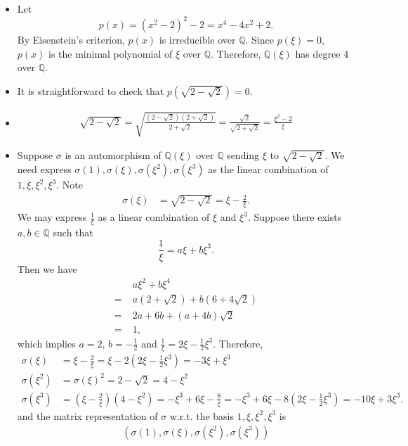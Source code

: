 \begin{solution}
	\begin{itemize}
		\item Let 
		\[
			p(x)=\left(x^2-2\right)^2-2=x^4-4x^2+2.
		\]
		By Eisenstein's criterion, $p(x)$ is irreducible over $\mathbb{Q}$. Since $p(\xi)=0$, $p(x)$ is the minimal polynomial of $\xi$ over $\mathbb{Q}$. Therefore, $\mathbb{Q}(\xi)$ has degree 4 over $\mathbb{Q}$.
		\item It is straightforward to check that $p\left(\sqrt{2-\sqrt{2}}\right)=0$.
		\item 
		\begin{align*}
			\sqrt{2-\sqrt{2}}=\sqrt{\frac{\left(2-\sqrt{2}\right)\left(2+\sqrt{2}\right)}{2+\sqrt{2}}}=\frac{\sqrt{2}}{\sqrt{2+\sqrt{2}}}=\frac{\xi^2-2}{\xi}
		\end{align*}
		\item Suppose $\sigma$ is an automorphism of $\mathbb{Q}(\xi)$ over $\mathbb{Q}$ sending $\xi$ to $\sqrt{2-\sqrt{2}}$. We need express $\sigma(1),\sigma(\xi),\sigma(\xi^2),\sigma(\xi^3)$ as the linear combination of $1, \xi, \xi^2, \xi^3$. Note 
		\begin{align*}
			\sigma(\xi)&=\sqrt{2-\sqrt{2}}=\xi-\frac{2}{\xi}.
		\end{align*}
		We may express $\frac{1}{\xi}$ as a linear combination of $\xi$ and $\xi^3$. Suppose there exists $a,b\in \mathbb{Q}$ such that
		\[
			\frac{1}{\xi}=a\xi+b\xi^3.
		\]
		Then we have
		\begin{align*}
			&\;a\xi^2+b\xi^4\\
			=&\;a(2+\sqrt{2})+b(6+4\sqrt{2})\\
			=&\;2a+6b+(a+4b)\sqrt{2}\\
			=&\;1,
		\end{align*}
		which implies $a=2$, $b=-\frac{1}{2}$ and $\frac{1}{\xi}=2\xi-\frac{1}{2}\xi^3$. Therefore, 
		\begin{align*}
			\sigma(\xi)&=\xi-\frac{2}{\xi}=\xi-2\left(2\xi-\frac{1}{2}\xi^3\right)=-3\xi+\xi^3\\
			\sigma\left(\xi^2\right)&=\sigma(\xi)^2=2-\sqrt{2}=4-\xi^2\\
			\sigma\left(\xi^3\right)&=\left(\xi-\frac{2}{\xi}\right)\left(4-\xi^2\right)=-\xi^3+6 \xi-\frac{8}{\xi}=-\xi^3+6 \xi-8\left(2\xi-\frac{1}{2}\xi^3\right)=-10\xi+3\xi^3.
		\end{align*}
		and the matrix representation of $\sigma$ w.r.t. the basis $1, \xi, \xi^2, \xi^3$ is 
		\begin{align*}
			&\hspace{15pt}\left(\sigma(1),\sigma(\xi),\sigma(\xi^2),\sigma(\xi^3)\right)\\

\end{align*}
\end{itemize}
\end{solution}
